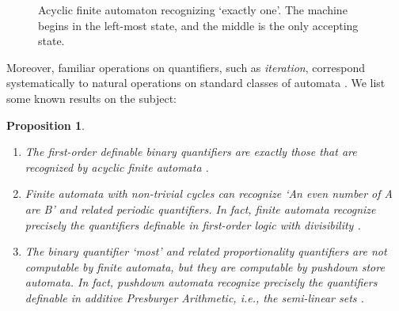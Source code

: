 \documentclass[12pt,oneside,reqno]{amsart}
\newtheorem{proposition}{Proposition}
\theoremstyle{definition}
\begin{document}
 \begin{figure} \centering 
    \caption{Acyclic finite automaton recognizing   `exactly one'. The machine begins in the left-most state, and the middle is the only accepting state.}\label{fig:aut}
\end{figure}

Moreover, familiar operations on quantifiers, such as \emph{iteration}, correspond systematically to natural operations on standard classes of automata \citep{Steinert}. We list some known results on the subject:

\begin{proposition}\label{prop:aut}\begin{enumerate}[label=(\alph*)] \item The first-order definable binary quantifiers are exactly those that are recognized by acyclic finite automata \citep{vanBenthem1985}.
  \item \label{prop:div} Finite automata with non-trivial cycles can recognize \emph{`An even number of A are B'} and related periodic quantifiers. In fact, finite automata recognize precisely the quantifiers definable in first-order logic with \emph{divisibility} \citep{Mostwoski1998}.
  \item The binary quantifier \emph{`most'} and related proportionality quantifiers are not computable by finite automata, but they are computable by pushdown store automata. In fact, pushdown automata recognize precisely the quantifiers definable in additive \emph{Presburger Arithmetic}, i.e., the \emph{semi-linear} sets \citep{vanBenthem1985}.
\end{enumerate}
\end{proposition}
\end{document}
